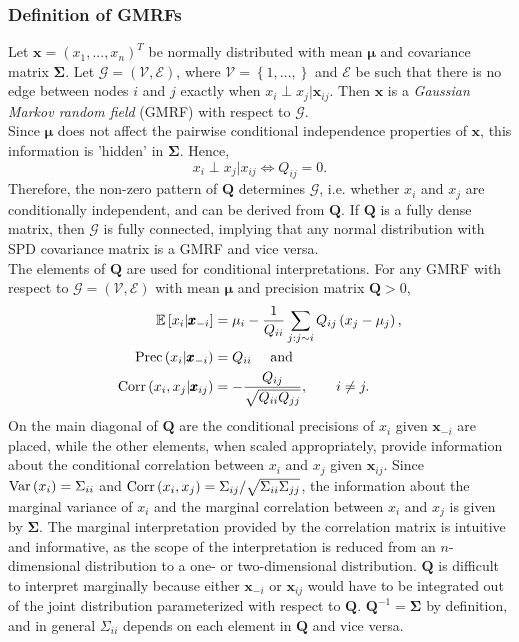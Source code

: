 \subsubsection{Definition of GMRFs}
Let $\pmb{x}=\left(x_1,...,x_n\right)^T$ be normally distributed with mean $\pmb{\mu}$ and covariance matrix $\pmb{\Sigma}$. Let $\mathcal{G}=\left(\mathcal{V}, \mathcal{E}\right)$, where $\mathcal{V}=\left\lbrace 1,...,\right\rbrace$ and $\mathcal{E}$ be such that there is no edge between nodes $i$ and $j$ exactly when $x_i\perp x_j|\pmb{x}_{ij}$. Then $\pmb{x}$ is a \textit{Gaussian Markov random field} (GMRF) with respect to $\mathcal{G}$. \\
Since $\pmb{\mu}$ does not affect the pairwise conditional independence properties of $\pmb{x}$, this information is 'hidden' in $\pmb{\Sigma}$. Hence,
\begin{equation*}
    x_i\perp x_j|x_{ij}\Longleftrightarrow Q_{ij}=0.
\end{equation*}
Therefore, the non-zero pattern of $\pmb{Q}$ determines $\mathcal{G}$, i.e. whether $x_i$ and $x_j$ are conditionally independent, and can be derived from $\pmb{Q}$. If $\pmb{Q}$ is a fully dense matrix, then $\mathcal{G}$ is fully connected, implying that any normal distribution with SPD covariance matrix is a GMRF and vice versa. \\
The elements of $\pmb{Q}$ are used for conditional interpretations. For any GMRF with respect to $\mathcal{G}=\left(\mathcal{V}, \mathcal{E}\right)$ with mean $\pmb{\mu}$ and precision matrix $\pmb{Q} > 0$,
\begin{align}
    \mathbb{E}\left[x_i|\pmb{x}_{-i}\right] &= \mu_i-\frac{1}{Q_{ii}}\sum_{j:j\sim i}Q_{ij}\left(x_j-\mu_j\right), \label{eq:mean_gmrf}\\
    \hbox{Prec}\left(x_i|\pmb{x}_{-i}\right) &= Q_{ii} \hspace{10pt}\hbox{ and }\label{eq:prec_gmrf}\\
    \hbox{Corr}\left(x_i,x_j|\pmb{x}_{ij}\right) &= -\frac{Q_{ij}}{\sqrt{Q_{ii}Q_{jj}}},\hspace{20pt} i\neq j.
\end{align}
On the main diagonal of $\pmb{Q}$ are the conditional precisions of $x_i$ given $\pmb{x}_{-i}$ are placed, while the other elements, when scaled appropriately, provide information about the conditional correlation between $x_i$ and $x_j$ given $\pmb{x}_{ij}$. Since $\hbox{Var}\left(x_i\right)=\Sigma_{ii}$ and $\hbox{Corr}\left(x_i,x_j\right)=\Sigma_{ij}/\sqrt{\Sigma_{ii}\Sigma_{jj}}$, the information about the marginal variance of $x_i$ and the marginal correlation between $x_i$ and $x_j$ is given by $\pmb{\Sigma}$. The marginal interpretation provided by the correlation matrix is intuitive and informative, as the scope of the interpretation is reduced from an $n$-dimensional distribution to a one- or two-dimensional distribution. $\pmb{Q}$ is difficult to interpret marginally because either $\pmb{x}_{-i}$ or $\pmb{x}_{ij}$ would have to be integrated out of the joint distribution parameterized with respect to $\pmb{Q}$. $\pmb{Q}^{-1}=\pmb{\Sigma}$ by definition, and in general $\Sigma_{ii}$ depends on each element in $\pmb{Q}$ and vice versa.
